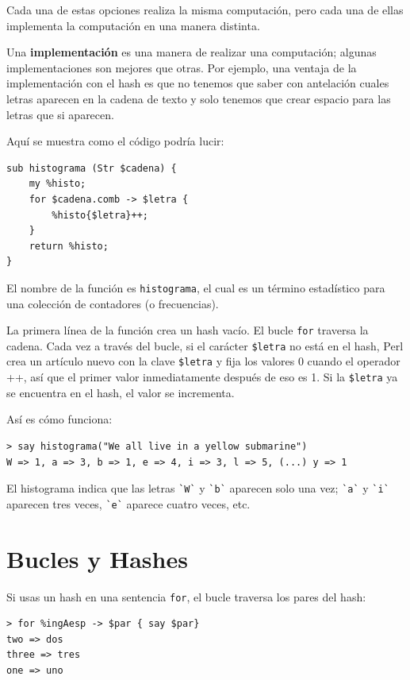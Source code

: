 Cada una de estas opciones realiza la misma computación,
pero cada una de ellas implementa la computación en una
manera distinta.

Una {\bf implementación} es una manera de realizar una computación;
algunas implementaciones son mejores que otras. Por ejemplo,
una ventaja de la implementación con el hash es que no tenemos
que saber con antelación cuales letras aparecen en la 
cadena de texto y solo tenemos que crear espacio para las letras
que si aparecen.

Aquí se muestra como el código podría lucir:

\begin{verbatim}
sub histograma (Str $cadena) {
    my %histo;
    for $cadena.comb -> $letra {
        %histo{$letra}++;
    }
    return %histo;
}
\end{verbatim}
%
El nombre de la función es {\tt histograma}, el cual es
un término estadístico para una colección de contadores (o frecuencias).

La primera línea de la función crea un hash vacío.
El bucle {\tt for} traversa la cadena. Cada vez a través
del bucle, si el carácter \verb|$letra| no está en el hash, Perl
crea un artículo nuevo con la clave \verb|$letra| y fija los 
valores 0 cuando el operador ++, así que el primer valor 
inmediatamente después de eso es 1. Si la \verb|$letra| 
ya se encuentra en el hash, el valor se incrementa.

Así es cómo funciona:

\begin{verbatim}
> say histograma("We all live in a yellow submarine")
W => 1, a => 3, b => 1, e => 4, i => 3, l => 5, (...) y => 1
\end{verbatim}
%
El histograma indica que las letras \verb|`W`| y \verb|`b`|
aparecen solo una vez; \verb|`a`| y \verb|`i`| aparecen
tres veces, \verb|`e`| aparece cuatro veces, etc.

\section{Bucles y Hashes}

Si usas un hash en una sentencia {\tt for}, el bucle 
traversa los pares del hash:

\begin{verbatim}
> for %ingAesp -> $par { say $par}
two => dos
three => tres
one => uno
\end{verbatim}
%


